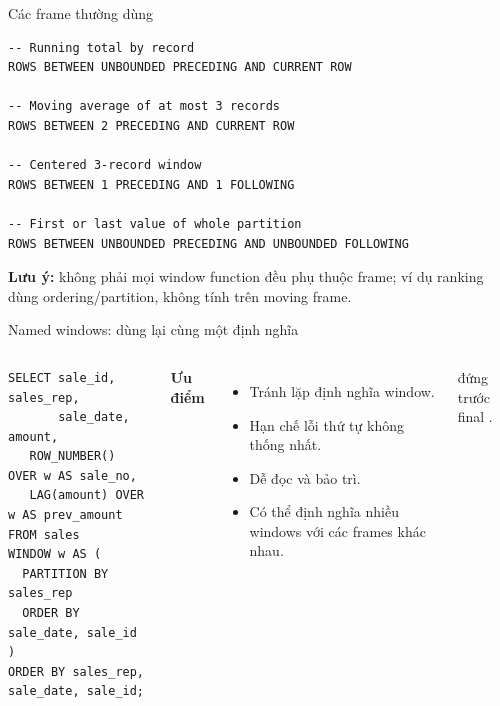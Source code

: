 \documentclass[aspectratio=169,11pt]{beamer}
\newcommand{\code}[1]{{\small\ttfamily\detokenize{#1}}}
\begin{document}
\begin{frame}[fragile]{Các frame thường dùng}
\begin{lstlisting}[basicstyle=\ttfamily\fontsize{9.2}{10.399999999999999}\selectfont]
-- Running total by record
ROWS BETWEEN UNBOUNDED PRECEDING AND CURRENT ROW

-- Moving average of at most 3 records
ROWS BETWEEN 2 PRECEDING AND CURRENT ROW

-- Centered 3-record window
ROWS BETWEEN 1 PRECEDING AND 1 FOLLOWING

-- First or last value of whole partition
ROWS BETWEEN UNBOUNDED PRECEDING AND UNBOUNDED FOLLOWING
\end{lstlisting}\vspace{.3em}\small\textbf{Lưu ý:} không phải mọi window function đều phụ thuộc frame; ví dụ ranking dùng ordering/partition, không tính trên moving frame.
\end{frame}

\begin{frame}[fragile]{Named windows: dùng lại cùng một định nghĩa}
\begin{columns}[T,onlytextwidth]
\begin{lstlisting}[basicstyle=\ttfamily\fontsize{7.9}{9.1}\selectfont]
SELECT sale_id, sales_rep,
       sale_date, amount,
   ROW_NUMBER() OVER w AS sale_no,
   LAG(amount) OVER w AS prev_amount
FROM sales
WINDOW w AS (
  PARTITION BY sales_rep
  ORDER BY sale_date, sale_id
)
ORDER BY sales_rep, sale_date, sale_id;
\end{lstlisting}

\textbf{Ưu điểm}\par
\begin{itemize}
\item Tránh lặp định nghĩa window.
\item Hạn chế lỗi thứ tự không thống nhất.
\item Dễ đọc và bảo trì.
\item Có thể định nghĩa nhiều windows với các frames khác nhau.
\end{itemize}
\small \code{WINDOW} đứng trước final \code{ORDER BY}.

\end{columns}
\end{frame}
\end{document}
